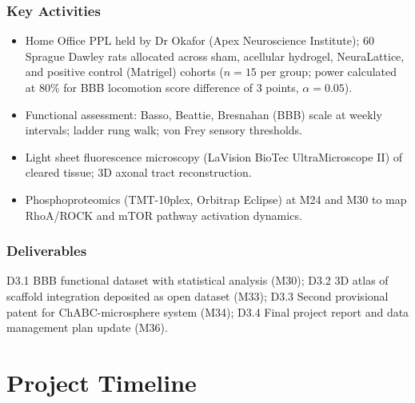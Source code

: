 \documentclass[11pt,a4paper]{article}
\begin{document}
\subsubsection{Key Activities}
\begin{itemize}
  \item Home Office PPL held by Dr Okafor (Apex Neuroscience Institute); 60 Sprague
    Dawley rats allocated across sham, acellular hydrogel, NeuraLattice, and positive
    control (Matrigel) cohorts (\(n = 15\) per group; power calculated at 80\% for
    BBB locomotion score difference of 3 points, \(\alpha = 0.05\)).
  \item Functional assessment: Basso, Beattie, Bresnahan (BBB) scale at weekly
    intervals; ladder rung walk; von Frey sensory thresholds.
  \item Light sheet fluorescence microscopy (LaVision BioTec UltraMicroscope II) of
    cleared tissue; 3D axonal tract reconstruction.
  \item Phosphoproteomics (TMT-10plex, Orbitrap Eclipse) at M24 and M30 to map
    RhoA/ROCK and mTOR pathway activation dynamics.
\end{itemize}

\subsubsection{Deliverables}
D3.1 BBB functional dataset with statistical analysis (M30); D3.2 3D atlas of scaffold
integration deposited as open dataset (M33); D3.3 Second provisional patent for
ChABC-microsphere system (M34); D3.4 Final project report and data management plan
update (M36).

\section{Project Timeline}

\vspace{4pt}
\end{document}
